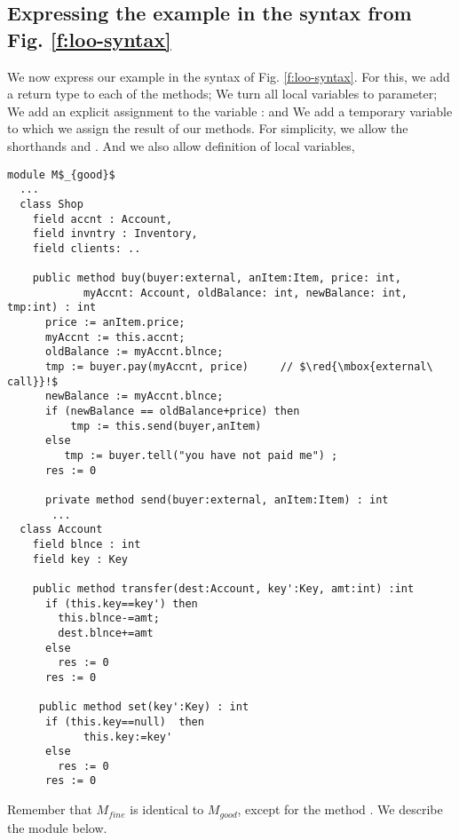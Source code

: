 \subsection{Expressing the  example in the syntax from Fig. \ref{f:loo-syntax}}
\label{s:app:syntax:transform}

{
We now express our example in the syntax of Fig. \ref{f:loo-syntax}. 
For this, we  add a return type to each of the methods; 
We turn all local variables to parameter; We add an explicit assignment to the variable : and We   add a temporary variable  to which we assign the result of our  methods.
For simplicity, we allow %
the shorthands \prg{+=} and \prg{-=}.
And we also allow definition of local variables, \eg  {} }

\begin{lstlisting}[mathescape=true, language=Chainmail, frame=lines]
module M$_{good}$
  ...   
  class Shop
    field accnt : Account, 
    field invntry : Inventory, 
    field clients: ..
  
    public method buy(buyer:external, anItem:Item, price: int, 
            myAccnt: Account, oldBalance: int, newBalance: int, tmp:int) : int
      price := anItem.price;
      myAccnt := this.accnt;
      oldBalance := myAccnt.blnce;
      tmp := buyer.pay(myAccnt, price)     // $\red{\mbox{external\ call}}!$
      newBalance := myAccnt.blnce;
      if (newBalance == oldBalance+price) then
          tmp := this.send(buyer,anItem)
      else
         tmp := buyer.tell("you have not paid me") ; 
      res := 0
     
      private method send(buyer:external, anItem:Item) : int
       ... 
  class Account
    field blnce : int 
    field key : Key
    
    public method transfer(dest:Account, key':Key, amt:int) :int
      if (this.key==key') then
        this.blnce-=amt;
        dest.blnce+=amt
      else
        res := 0
      res := 0
	  
     public method set(key':Key) : int
      if (this.key==null)  then
      		this.key:=key'
      else 
        res := 0
      res := 0
\end{lstlisting}

\noindent
Remember that $M_{fine}$ is identical to $M_{good}$, except for the method . We describe the module below.

